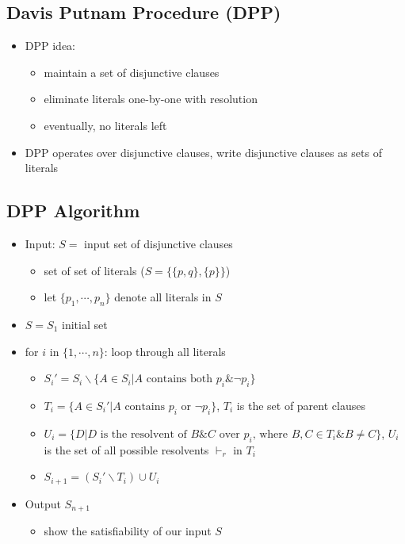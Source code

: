 \documentclass[11pt]{article}
\begin{document}
\subsection{Davis Putnam Procedure (DPP)}
\begin{itemize}
    \item DPP idea:
    \begin{itemize}
        \item maintain a set of disjunctive clauses 
        \item eliminate literals one-by-one with resolution 
        \item eventually, no literals left 
    \end{itemize}
    \item DPP operates over disjunctive clauses, write disjunctive clauses as sets of literals 
\end{itemize}
\subsection*{DPP Algorithm}
\begin{itemize}
    \item Input: $S=$ input set of disjunctive clauses 
    \begin{itemize}
        \item set of set of literals ($S=\{\{p,q\},\{p\}\}$)
        \item let $\{p_1,\cdots,p_n\}$ denote all literals in $S$
    \end{itemize}
    \item $S=S_1$ initial set 
    \item for $i$ in $\{1,\cdots,n\}$: loop through all literals 
    \begin{itemize}
        \item $S_i'=S_i\backslash\{A\in S_i|A\text{ contains both $p_i\&\neg p_i$}\}$
        \item $T_i=\{A\in S_i'|A\text{ contains $p_i$ or $\neg p_i$}\}$, $T_i$ is the set of parent clauses 
        \item $U_i=\{D|D\text{ is the resolvent of $B\& C$ over $p_i$, where $B,C\in T_i\& B\neq C$}\}$, $U_i$ is the set of all possible resolvents $\vdash_r$ in $T_i$
        \item $S_{i+1}=(S_i'\backslash T_i)\cup U_i$
    \end{itemize}
    \item Output $S_{n+1}$
    \begin{itemize}
        \item show the satisfiability of our input $S$
    \end{itemize}
\end{itemize}
\end{document}
